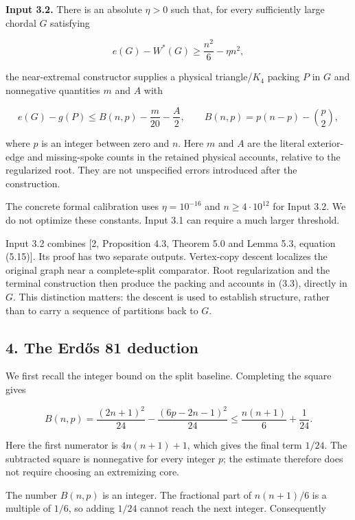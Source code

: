 \documentclass[english,11pt,a4paper]{article}
\begin{document}
\textbf{Input 3.2.} There is an absolute \(\eta>0\) such that, for every
sufficiently large chordal \(G\) satisfying

\[
e(G)-W^*(G)\ge\frac{n^2}{6}-\eta n^2,
\tag{3.2}
\]

the near-extremal constructor supplies a physical triangle/\(K_4\)
packing \(P\) in \(G\) and nonnegative quantities \(m\) and \(A\) with

\[
e(G)-g(P)\le B(n,p)-\frac m{20}-\frac A2,
\qquad
B(n,p)=p(n-p)-\binom p2,
\tag{3.3}
\]

where \(p\) is an integer between zero and \(n\). Here \(m\) and \(A\)
are the literal exterior-edge and missing-spoke counts in the retained
physical accounts, relative to the regularized root. They are not
unspecified errors introduced after the construction.

The concrete formal calibration uses \(\eta=10^{-16}\) and
\(n\ge4\cdot10^{12}\) for Input 3.2. We do not optimize these constants.
Input 3.1 can require a much larger threshold.

Input 3.2 combines {[}2, Proposition 4.3, Theorem 5.0 and Lemma 5.3,
equation (5.15){]}. Its proof has two separate outputs. Vertex-copy
descent localizes the original graph near a complete-split comparator.
Root regularization and the terminal construction then produce the
packing and accounts in (3.3), directly in \(G\). This distinction
matters: the descent is used to establish structure, rather than to
carry a sequence of partitions back to \(G\).

\subsection{4. The Erdős 81 deduction}\label{the-erdux151s-81-deduction}

We first recall the integer bound on the split baseline. Completing the
square gives

\[
B(n,p)=\frac{(2n+1)^2}{24}
-\frac{(6p-2n-1)^2}{24}
\le\frac{n(n+1)}6+\frac1{24}.
\tag{4.1}
\]

Here the first numerator is \(4n(n+1)+1\), which gives the final term
\(1/24\). The subtracted square is nonnegative for every integer \(p\);
the estimate therefore does not require choosing an extremizing core.

The number \(B(n,p)\) is an integer. The fractional part of \(n(n+1)/6\)
is a multiple of \(1/6\), so adding \(1/24\) cannot reach the next
integer. Consequently
\end{document}
